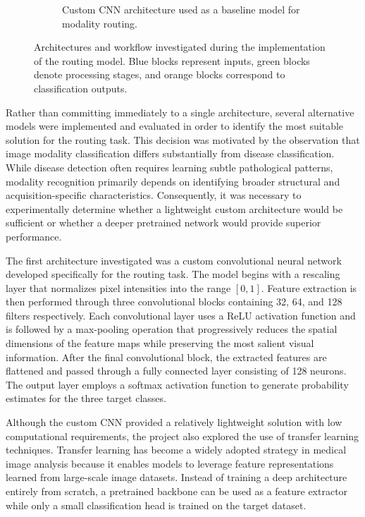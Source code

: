 \begin{figure}[H]
\begin{subfigure}{0.95\textwidth}
{
		}
		\caption{Custom CNN architecture used as a baseline model for modality routing.}
	\end{subfigure}
	
	\caption{Architectures and workflow investigated during the implementation of the routing model. Blue blocks represent inputs, green blocks denote processing stages, and orange blocks correspond to classification outputs.}
	\label{fig:routing_model_overview}
	
\end{figure}

Rather than committing immediately to a single architecture, several alternative models were implemented and evaluated in order to identify the most suitable solution for the routing task. This decision was motivated by the observation that image modality classification differs substantially from disease classification. While disease detection often requires learning subtle pathological patterns, modality recognition primarily depends on identifying broader structural and acquisition-specific characteristics. Consequently, it was necessary to experimentally determine whether a lightweight custom architecture would be sufficient or whether a deeper pretrained network would provide superior performance.

The first architecture investigated was a custom convolutional neural network developed specifically for the routing task. The model begins with a rescaling layer that normalizes pixel intensities into the range $[0,1]$. Feature extraction is then performed through three convolutional blocks containing 32, 64, and 128 filters respectively. Each convolutional layer uses a ReLU activation function and is followed by a max-pooling operation that progressively reduces the spatial dimensions of the feature maps while preserving the most salient visual information. After the final convolutional block, the extracted features are flattened and passed through a fully connected layer consisting of 128 neurons. The output layer employs a softmax activation function to generate probability estimates for the three target classes.

Although the custom CNN provided a relatively lightweight solution with low computational requirements, the project also explored the use of transfer learning techniques. Transfer learning has become a widely adopted strategy in medical image analysis because it enables models to leverage feature representations learned from large-scale image datasets. Instead of training a deep architecture entirely from scratch, a pretrained backbone can be used as a feature extractor while only a small classification head is trained on the target dataset.

